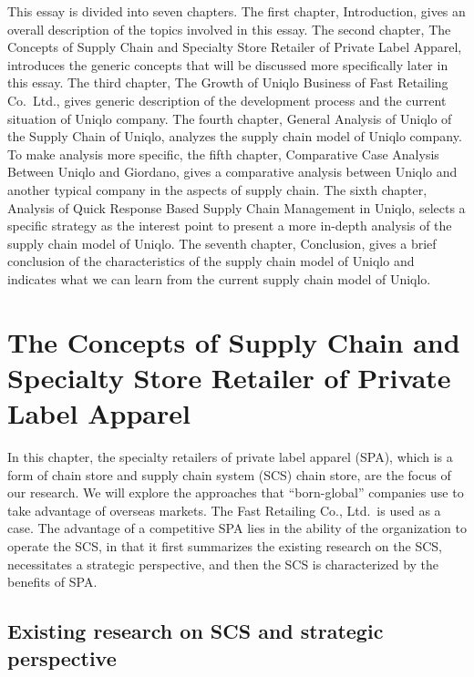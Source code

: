 \documentclass[12pt,]{article}
\begin{document}
This essay is divided into seven chapters. The first chapter,
Introduction, gives an overall description of the topics involved in
this essay. The second chapter, The Concepts of Supply Chain and
Specialty Store Retailer of Private Label Apparel, introduces the
generic concepts that will be discussed more specifically later in this
essay. The third chapter, The Growth of Uniqlo Business of Fast
Retailing Co.~Ltd., gives generic description of the development process
and the current situation of Uniqlo company. The fourth chapter, General
Analysis of Uniqlo of the Supply Chain of Uniqlo, analyzes the supply
chain model of Uniqlo company. To make analysis more specific, the fifth
chapter, Comparative Case Analysis Between Uniqlo and Giordano, gives a
comparative analysis between Uniqlo and another typical company in the
aspects of supply chain. The sixth chapter, Analysis of Quick Response
Based Supply Chain Management in Uniqlo, selects a specific strategy as
the interest point to present a more in-depth analysis of the supply
chain model of Uniqlo. The seventh chapter, Conclusion, gives a brief
conclusion of the characteristics of the supply chain model of Uniqlo
and indicates what we can learn from the current supply chain model of
Uniqlo.

\hypertarget{the-concepts-of-supply-chain-and-specialty-store-retailer-of-private-label-apparel}{%
\section{The Concepts of Supply Chain and Specialty Store Retailer of
Private Label
Apparel}\label{the-concepts-of-supply-chain-and-specialty-store-retailer-of-private-label-apparel}}

In this chapter, the specialty retailers of private label apparel (SPA),
which is a form of chain store and supply chain system (SCS) chain
store, are the focus of our research. We will explore the approaches
that ``born-global'' companies use to take advantage of overseas
markets. The Fast Retailing Co., Ltd.~is used as a case. The advantage
of a competitive SPA lies in the ability of the organization to operate
the SCS, in that it first summarizes the existing research on the SCS,
necessitates a strategic perspective, and then the SCS is characterized
by the benefits of SPA.

\hypertarget{existing-research-on-scs-and-strategic-perspective}{%
\subsection{Existing research on SCS and strategic
perspective}\label{existing-research-on-scs-and-strategic-perspective}}
\end{document}
